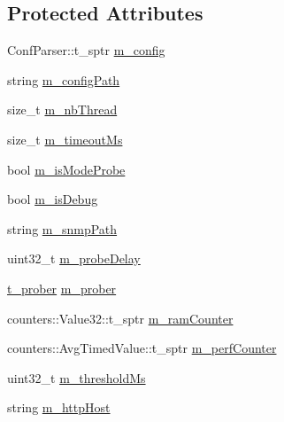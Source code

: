 \subsection*{Protected Attributes}
\begin{DoxyCompactItemize}
\item 
Conf\-Parser\-::t\-\_\-sptr \hyperlink{classxtd_1_1servers_1_1app_1_1HttpServer_ada282c895467a8d2fcaee543560958dc}{m\-\_\-config}
\item 
string \hyperlink{classxtd_1_1servers_1_1app_1_1HttpServer_aa07526617267875dd907e29b99711ab6}{m\-\_\-config\-Path}
\item 
size\-\_\-t \hyperlink{classxtd_1_1servers_1_1app_1_1HttpServer_a2f0812d24ccfd55e943f3144c672b473}{m\-\_\-nb\-Thread}
\item 
size\-\_\-t \hyperlink{classxtd_1_1servers_1_1app_1_1HttpServer_adcaefcc003e9503dbe6ebea90bf70ef7}{m\-\_\-timeout\-Ms}
\item 
bool \hyperlink{classxtd_1_1servers_1_1app_1_1HttpServer_a3ae2e35fc931b303e244b01e277cb8dd}{m\-\_\-is\-Mode\-Probe}
\item 
bool \hyperlink{classxtd_1_1servers_1_1app_1_1HttpServer_ae8b1e546b8f464e0a18c6b737ed82df8}{m\-\_\-is\-Debug}
\item 
string \hyperlink{classxtd_1_1servers_1_1app_1_1HttpServer_a555ce1e115602fda522a5c0a675dace3}{m\-\_\-snmp\-Path}
\item 
uint32\-\_\-t \hyperlink{classxtd_1_1servers_1_1app_1_1HttpServer_a87fc30b2e7e6ab2aabc2c46c884d7f17}{m\-\_\-probe\-Delay}
\item 
\hyperlink{classxtd_1_1servers_1_1app_1_1HttpServer_ace89439f838ede46ec55a6ec7cc27888}{t\-\_\-prober} \hyperlink{classxtd_1_1servers_1_1app_1_1HttpServer_aa26ddc958ab07774e8ba45e89dc0011b}{m\-\_\-prober}
\item 
counters\-::\-Value32\-::t\-\_\-sptr \hyperlink{classxtd_1_1servers_1_1app_1_1HttpServer_a0758f122d486bc068d796d4ce550e99f}{m\-\_\-ram\-Counter}
\item 
counters\-::\-Avg\-Timed\-Value\-::t\-\_\-sptr \hyperlink{classxtd_1_1servers_1_1app_1_1HttpServer_afc57d4c9bc2f9a47440e3c54eb92b1fb}{m\-\_\-perf\-Counter}
\item 
uint32\-\_\-t \hyperlink{classxtd_1_1servers_1_1app_1_1HttpServer_ad7f8a9a0475e17154850c3d575bf6f05}{m\-\_\-threshold\-Ms}
\item 
string \hyperlink{classxtd_1_1servers_1_1app_1_1HttpServer_af1676247676379d0c12008bdcd5b7e17}{m\-\_\-http\-Host}
\item 

\end{DoxyCompactItemize}
